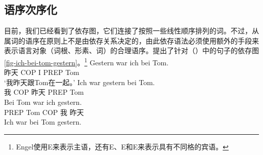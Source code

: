 \subsection{语序次序化}
\label{sec-dg-linearization}

目前，我们已经看到了依存图，它们连接了按照一些线性顺序排列的词。不过，从属词的语序在原则上不是由依存关系决定的，由此依存语法必须使用额外的手段来表示语言对象（词根、形素、词）的合理语序。\citet[]{Engel2014a}提出了针对（）中的句子的依存图\vref{fig-ich-bei-tom-gestern}。\footnote{%
Engel使用E来表示主语，还有E、E和E来表示具有不同格的宾语。
}
\eal
\label{ex-gestern-war-ich-bei-tom}
\ex 
\gll Gestern war ich bei Tom.\\
     昨天 COP I PREP Tom\\
\glt `我昨天跟Tom在一起。'
\ex 
\gll Ich war gestern bei Tom.\\
     我   COP 昨天 PREP Tom\\
\ex 
\gll Bei Tom war ich gestern.\\
     PREP Tom  COP 我 昨天\\
\ex 
\gll Ich war bei Tom gestern.\\
